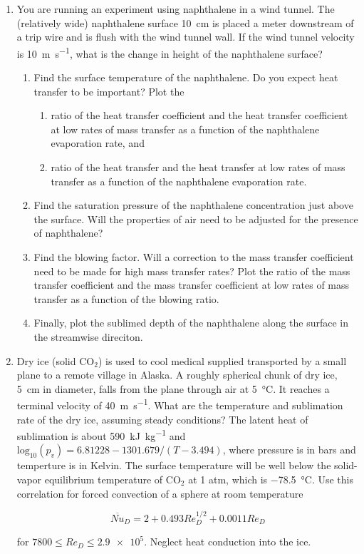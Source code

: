 \documentclass[12pt,letterpaper]{article}
\begin{document}
\begin{enumerate}
    \item You are running an experiment using naphthalene in a wind tunnel.
        The (relatively wide) naphthalene surface \SI{10}{\centi\meter} is placed a meter downstream of a trip wire and is flush with the wind tunnel wall.
        If the wind tunnel velocity is \SI{10}{\meter\per\second}, what is the change in height of the naphthalene surface?
        \begin{enumerate}
            \item Find the surface temperature of the naphthalene.
                Do you expect heat transfer to be important?
                Plot the 
                \begin{enumerate}
                    \item ratio of the heat transfer coefficient and the heat transfer coefficient at low rates of mass transfer as a function of the naphthalene evaporation rate, and
                    \item ratio of the heat transfer and the heat transfer at low rates of mass transfer as a function of the naphthalene evaporation rate.
                \end{enumerate}
            \item Find the saturation pressure of the naphthalene concentration just above the surface.
                Will the properties of air need to be adjusted for the presence of naphthalene? 
            \item Find the blowing factor.
                Will a correction to the mass transfer coefficient need to be made for high mass transfer rates?
                Plot the ratio of the mass transfer coefficient and the mass transfer coefficient at low rates of mass transfer as a function of the blowing ratio.
            \item Finally, plot the sublimed depth of the naphthalene along the surface in the streamwise direciton.
        \end{enumerate}

    \item Dry ice (solid $\mathrm{C} \mathrm{O}_2$) is used to cool medical supplied transported by a small plane to a remote village in Alaska.
        A roughly spherical chunk of dry ice, \SI{5}{\centi\meter} in diameter, falls from the plane through air at \SI{5}{\celsius}.
        It reaches a terminal velocity of \SI{40}{\meter\per\second}.
        What are the temperature and sublimation rate of the dry ice, assuming steady conditions?
        The latent heat of sublimation is about \SI{590}{\kilo\joule\per\kilogram} and $\mathrm{log}_{10} \left( p_v  \right) = 6.81228 - 1301.679 / \left( T - 3.494 \right)$, where pressure is in bars and temperture is in Kelvin.
        The surface temperature will be well below the solid-vapor equilibrium temperature of $\mathrm{C} \mathrm{O}_2$ at 1 atm, which is \SI{-78.5}{\celsius}.
        Use this correlation for forced convection of a sphere at room temperature

        \begin{equation*}
                \overline{\mathit{Nu}}_D = 2 + 0.493 \mathit{Re}_D^{1/2} + 0.0011 \mathit{Re}_D
        \end{equation*}

        for $7800 \leq \mathit{Re}_D \leq \num{2.9e5}$.
        Neglect heat conduction into the ice.
\end{enumerate}
\end{document}
